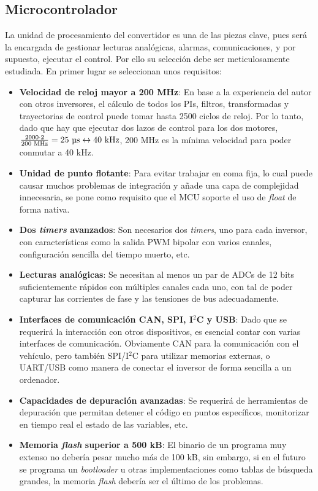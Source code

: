 \subsection{Microcontrolador}

La unidad de procesamiento del convertidor es una de las piezas clave, pues será la encargada de gestionar lecturas analógicas, alarmas, comunicaciones, y por supuesto, ejecutar el control. Por ello su selección debe ser meticulosamente estudiada. En primer lugar se seleccionan unos requisitos:

\begin{itemize}
	\item \textbf{Velocidad de reloj mayor a 200 MHz}: En base a la experiencia del autor con otros inversores, el cálculo de todos los PIs, filtros, transformadas y trayectorias de control puede tomar hasta 2500 ciclos de reloj. Por lo tanto, dado que hay que ejecutar dos lazos de control para los dos motores, $\frac{2000 \cdot 2}{200 \text{ MHz}} = 25 \text{ }\text{\unit{\micro\second}} \leftrightarrow 40 \text{ kHz}$, 200 MHz es la mínima velocidad para poder conmutar a 40 kHz.
	\item \textbf{Unidad de punto flotante}: Para evitar trabajar en coma fija, lo cual puede causar muchos problemas de integración y añade una capa de complejidad innecesaria, se pone como requisito que el MCU soporte el uso de \textit{float} de forma nativa.
	\item \textbf{Dos \textit{timers} avanzados}: Son necesarios dos \textit{timers}, uno para cada inversor, con características como la salida PWM bipolar con varios canales, configuración sencilla del tiempo muerto, etc.
	\item \textbf{Lecturas analógicas}: Se necesitan al menos un par de ADCs de 12 bits suficientemente rápidos con múltiples canales cada uno, con tal de poder capturar las corrientes de fase y las tensiones de bus adecuadamente.
	\item \textbf{Interfaces de comunicación CAN, SPI, I$^2$C y USB}: Dado que se requerirá la interacción con otros dispositivos, es esencial contar con varias interfaces de comunicación. Obviamente CAN para la comunicación con el vehículo, pero también SPI/I$^2$C para utilizar memorias externas, o UART/USB como manera de conectar el inversor de forma sencilla a un ordenador.
	\item \textbf{Capacidades de depuración avanzadas}: Se requerirá de herramientas de depuración que permitan detener el código en puntos específicos, monitorizar en tiempo real el estado de las variables, etc.
	\item \textbf{Memoria \textit{flash} superior a 500 kB}: El binario de un programa muy extenso no debería pesar mucho más de 100 kB, sin embargo, si en el futuro se programa un \textit{bootloader} u otras implementaciones como tablas de búsqueda grandes, la memoria \textit{flash} debería ser el último de los problemas.
	
\end{itemize}

